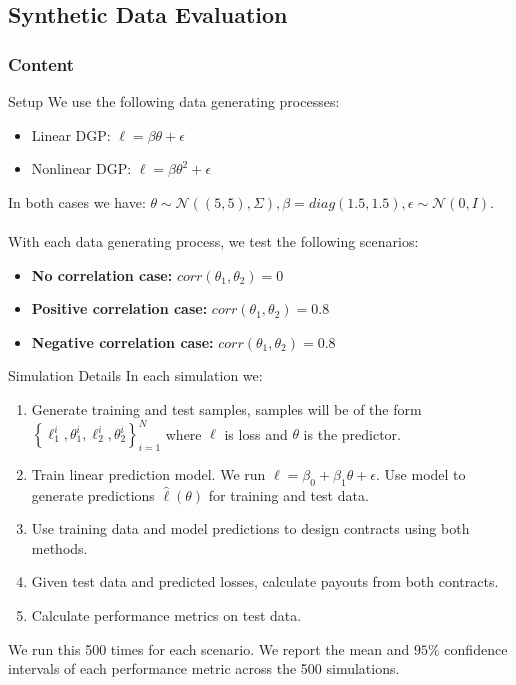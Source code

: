 \documentclass{beamer}
\begin{document}
\subsection{Synthetic Data Evaluation}
\begin{frame}
    \frametitle{Content}
\end{frame}

\begin{frame}{Setup}
    We use the following data generating processes:  
      \begin{itemize}
        \item Linear DGP: $\ell = \beta \theta + \epsilon$
        \item Nonlinear DGP: $\ell = \beta \theta^2 + \epsilon$
      \end{itemize}

    In both cases we have: $\theta \sim \mathcal{N}((5,5),\Sigma), \beta = diag(1.5,1.5), \epsilon \sim \mathcal{N}(0,I)$. \\~~\\
    With each data generating process, we test the following scenarios: 
    \begin{itemize}
          \item \textbf{No correlation case:} $corr(\theta_1,\theta_2) = 0$
          \item \textbf{Positive correlation case:} $corr(\theta_1,\theta_2) = 0.8$
          \item \textbf{Negative correlation case:} $corr(\theta_1,\theta_2) = 0.8$
      \end{itemize}
\end{frame}

\begin{frame}{Simulation Details}
In each simulation we: 
    \begin{enumerate}
        \item Generate training and test samples, samples will be of the form $\left \{\ell^i_1,\theta^i_1, \ell^i_2, \theta^i_2 \right \}_{i=1}^N$ where $\ell$ is loss and $\theta$ is the predictor. 
        \item Train linear prediction model. We run $\ell = \beta_0 + \beta_1\theta +\epsilon$. Use model to generate predictions $\hat{\ell}(\theta)$ for training and test data. 
        \item Use training data and model predictions to design contracts using both methods.  
        \item Given test data and predicted losses, calculate payouts from both contracts. 
        \item Calculate performance metrics on test data. 
        \end{enumerate}
We run this 500 times for each scenario. We report the mean and $95 \%$ confidence intervals of each performance metric across the 500 simulations.
\end{frame}
\end{document}
